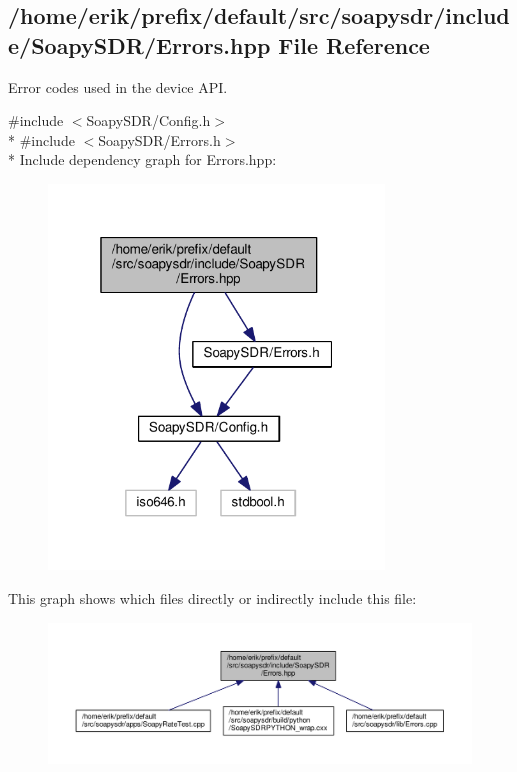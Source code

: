 \subsection{/home/erik/prefix/default/src/soapysdr/include/\+Soapy\+S\+D\+R/\+Errors.hpp File Reference}
\label{Errors_8hpp}


Error codes used in the device A\+PI.  


{\ttfamily \#include $<$Soapy\+S\+D\+R/\+Config.\+h$>$}\\*
{\ttfamily \#include $<$Soapy\+S\+D\+R/\+Errors.\+h$>$}\\*
Include dependency graph for Errors.\+hpp\+:
\nopagebreak
\begin{figure}[H]
\begin{center}
\leavevmode
\includegraphics[width=253pt]{dd/d76/Errors_8hpp__incl}
\end{center}
\end{figure}
This graph shows which files directly or indirectly include this file\+:
\nopagebreak
\begin{figure}[H]
\begin{center}
\leavevmode
\includegraphics[width=350pt]{d5/dba/Errors_8hpp__dep__incl}
\end{center}
\end{figure}
